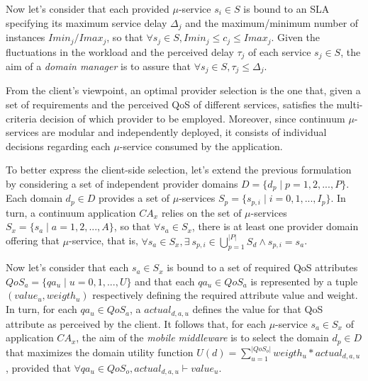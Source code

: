 Now let's consider that each provided $\mu$-service $s_i \in S$ is bound to an SLA specifying its maximum service delay $\Delta_j$ and the maximum/minimum number of instances $Imin_{j}/Imax_{j}$, so that $\forall s_j \in S, Imin_j \le c_j \le Imax_j$. %
Given the fluctuations in the workload and the perceived delay $\tau_j$ of each service $s_j \in S$, the aim of a \textit{domain manager} is to assure that $\forall s_j \in S, \tau_j \le \Delta_j$.



From the client's viewpoint, an optimal provider selection is the one that, given a set of requirements and the perceived QoS of different services, satisfies the multi-criteria decision of which provider to be employed. Moreover, since continuum $\mu$-services are modular and independently deployed, it consists of individual decisions regarding each $\mu$-service consumed by the application.

To better express the client-side selection, let's extend the previous formulation by considering a set of independent provider domains $D = \{d_p \mid p = 1,2,...,P\}$. Each domain $d_p \in D$ provides a set of $\mu$-services $S_{p} = \{s_{p,i} \mid i =  0, 1, ..., I_p\}$. In turn, a continuum application $CA_x$ relies on the set of $\mu$-services $S_x = \{s_a \mid a = 1,2,...,A\}$, so that $\forall s_a \in S_x$, there is at least one provider domain offering that $\mu$-service, that is, $\forall s_a \in S_x, \exists\ s_{p,i} \in \bigcup_{p=1}^{|P|} S_d \wedge s_{p,i} = s_a$. 

Now let's consider that each $s_a \in S_x$ is bound to a set of required QoS attributes $QoS_a = \{qa_u \mid u = 0, 1, ..., U\}$ and that each $qa_u \in QoS_a$ is represented by a tuple $(value_u, weigth_u)$ respectively defining the required attribute value and weight. In turn, for each $qa_u \in QoS_a$, a $actual_{d,a,u}$ defines the value for that QoS attribute as perceived by the client. It follows that, for each $\mu$-service $s_a \in S_x$ of application $CA_x$, the aim of the \textit{mobile middleware} is to select the domain $d_p \in D$ 
that maximizes the domain utility function $U(d) = \sum_{u=1}^{|QoS_o|} weigth_u * actual_{d,a,u}$, provided that $\forall qa_u \in QoS_o, actual_{d,a,u} \vdash value_u$.


